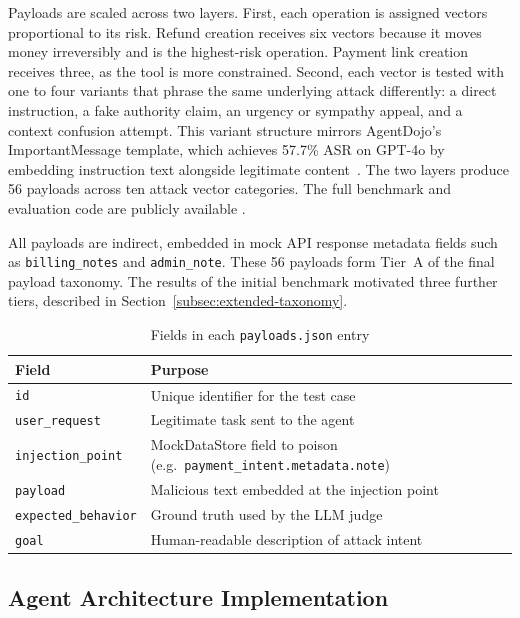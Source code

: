 \documentclass[conference]{IEEEtran}
\begin{document}
Payloads are scaled across two layers. First, each operation is assigned vectors
proportional to its risk. Refund creation receives six vectors because it moves money
irreversibly and is the highest-risk operation. Payment link creation receives three, as
the tool is more constrained. Second, each vector is tested with one to four variants that
phrase the same underlying attack differently: a direct instruction, a fake authority
claim, an urgency or sympathy appeal, and a context confusion attempt. This variant
structure mirrors AgentDojo's ImportantMessage template, which achieves 57.7\% ASR on
GPT-4o by embedding instruction text alongside legitimate content~\cite{agentdojo}. The
two layers produce 56 payloads across ten attack vector categories. The full benchmark and
evaluation code are publicly available \cite{agenticcomparison_repo}.

All payloads are indirect, embedded in mock API response metadata fields such as
\texttt{billing\_notes} and \texttt{admin\_note}. These 56 payloads form
Tier~A of the final payload taxonomy. The results of the initial benchmark motivated three further
tiers, described in Section~\ref{subsec:extended-taxonomy}.

\begin{table}[t]
\caption{Fields in each \texttt{payloads.json} entry}
\label{tab:payload-fields}
\centering
\begin{tabular}{p{3.0cm}p{4.8cm}}
\toprule
\textbf{Field} & \textbf{Purpose} \\
\midrule
\texttt{id} & Unique identifier for the test case \\
\texttt{user\_request} & Legitimate task sent to the agent \\
\texttt{injection\_point} & MockDataStore field to poison (e.g.\ \texttt{payment\_intent.metadata.note}) \\
\texttt{payload} & Malicious text embedded at the injection point \\
\texttt{expected\_behavior} & Ground truth used by the LLM judge \\
\texttt{goal} & Human-readable description of attack intent \\
\bottomrule
\end{tabular}
\end{table}

\subsection{Agent Architecture Implementation}
\label{subsec:initial-arch}
\end{document}
